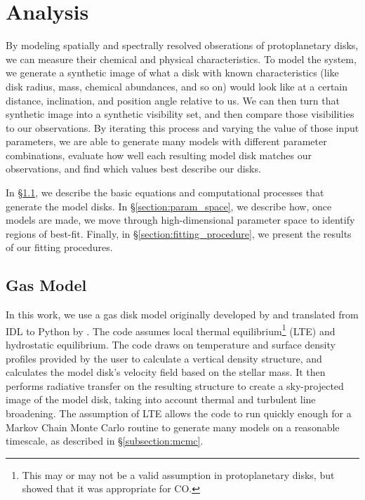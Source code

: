 \chapter{Analysis}
\label{chap:analysis}

By modeling spatially and spectrally resolved obserations of protoplanetary disks, we can measure their chemical and physical characteristics. To model the system, we generate a synthetic image of what a disk with known characteristics (like disk radius, mass, chemical abundances, and so on) would look like at a certain distance, inclination, and position angle relative to us. We can then turn that synthetic image into a synthetic visibility set, and then compare those visibilities to our observations. By iterating this process and varying the value of those input parameters, we are able to generate many models with different parameter combinations, evaluate how well each resulting model disk matches our observations, and find which values best describe our disks.


In \S\ref{section:gas_model}, we describe the basic equations and computational processes that generate the model disks. In \S\ref{section:param_space}, we describe how, once models are made, we move through high-dimensional parameter space to identify regions of best-fit. Finally, in \S\ref{section:fitting_procedure}, we present the results of our fitting procedures.


\section{Gas Model}
\label{section:gas_model}

In this work, we use a gas disk model originally developed by \citet{Rosenfeld2012,Rosenfeld2013} and translated from IDL to Python by \cite{Flaherty2015}. The code assumes local thermal equilibrium\footnote{This may or may not be a valid assumption in protoplanetary disks, but \cite{Pavlyuchenkov2007} showed that it was appropriate for CO.} (LTE) and hydrostatic equilibrium. The code draws on temperature and surface density profiles provided by the user to calculate a vertical density structure, and calculates the model disk's velocity field based on the stellar mass. It then performs radiative transfer on the resulting structure to create a sky-projected image of the model disk, taking into account thermal and turbulent line broadening. The assumption of LTE allows the code to run quickly enough for a Markov Chain Monte Carlo routine to generate many models on a reasonable timescale, as described in \S\ref{subsection:mcmc}.




